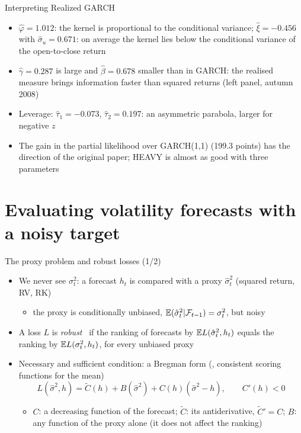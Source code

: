 \begin{frame}{Interpreting Realized GARCH}
\itemsize{\small}
\begin{itemize}
    \item $\hat\varphi = 1.012$: the kernel is proportional to the conditional variance; $\hat\xi = \ensuremath{-}0.456$ with $\hat\sigma_u = 0.671$: on average the kernel lies below the conditional variance of the open-to-close return
    \item $\hat\gamma = 0.287$ is large and $\hat\beta = 0.678$ smaller than in GARCH: the realised measure brings information faster than squared returns (left panel, autumn 2008)
    \item Leverage: $\hat\tau_1 = \ensuremath{-}0.073$, $\hat\tau_2 = 0.197$: an asymmetric parabola, larger for negative $z$
    \item The gain in the partial likelihood over GARCH(1,1) (199.3 points) has the direction of the original paper; HEAVY is almost as good with three parameters
\end{itemize}
\end{frame}


\section{Evaluating volatility forecasts with a noisy target}

\begin{frame}{The proxy problem and robust losses (1/2)}
\itemsize{\small}
\begin{itemize}
    \item We never see $\sigma^2_t$: a forecast $h_t$ is compared with a proxy $\hat\sigma^2_t$ (squared return, RV, RK)
    \begin{itemize}
        \item the proxy is conditionally unbiased, $\mathbb{E}(\hat\sigma^2_t | \mathcal F_{t-1}) = \sigma^2_t$, but noisy
    \end{itemize}
    \item A loss $L$ is \emph{robust} \ if the ranking of forecasts by $\mathbb{E} L(\hat\sigma^2_t, h_t)$ equals the ranking by $\mathbb{E} L(\sigma^2_t, h_t)$, for every unbiased proxy 
    \item Necessary and sufficient condition: a Bregman form (, consistent scoring functions for the mean)
    \[ L(\hat\sigma^2, h) = \tilde C(h) + B(\hat\sigma^2) + C(h)(\hat\sigma^2 - h), \qquad C'(h) < 0 \]
    \begin{itemize}
        \item $C$: a decreasing function of the forecast; $\tilde C$: its antiderivative, $\tilde C' = C$; $B$: any function of the proxy alone (it does not affect the ranking)
    \end{itemize}
\end{itemize}
\end{frame}

